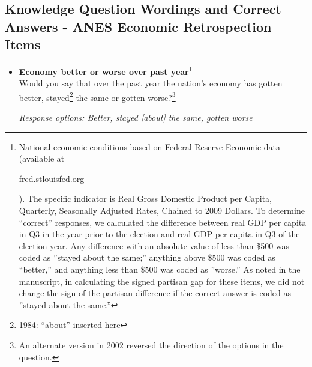 \documentclass[12pt, letterpaper]{article}
\begin{document}
\vspace{-3cm}
\subsection{Knowledge Question Wordings and Correct Answers - ANES Economic Retrospection Items}
\label{append_q_text_anes_econ}

\normalsize
{\begin{itemize}
\item \textbf{Economy better or worse over past year}\footnote{National economic conditions based on Federal Reserve Economic data (available at \begin{footnotesize} \url{fred.stlouisfed.org} \end{footnotesize}). The specific indicator is Real Gross Domestic Product per Capita, Quarterly, Seasonally Adjusted Rates, Chained to 2009 Dollars. To determine ``correct'' responses, we calculated the difference between real GDP per capita in Q3 in the year prior to the election and real GDP per capita in Q3 of the election year. Any difference with an absolute value of less than \$500 was coded as ''stayed about the same;'' anything above \$500 was coded as ``better,'' and anything less than \$500 was coded as ''worse.'' As noted in the manuscript, in calculating the signed partisan gap for these items, we did not change the sign of the partisan difference if the correct answer is coded as ''stayed about the same.''}   \\
Would you say that over the past year the nation's economy has gotten better, stayed\footnote{1984: ``about'' inserted here} the same or gotten worse?\footnote{An alternate version in 2002 reversed the direction of the options in the question.} 

\textit{Response options: Better, stayed [about] the same, gotten worse} \\


\end{itemize}}
\end{document}
